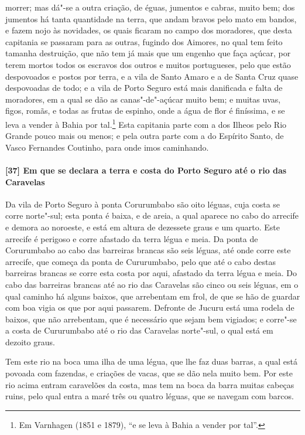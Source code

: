 morrer; mas dá"-se a outra criação, de éguas, jumentos e cabras, muito bem; dos jumentos há
tanta quantidade na terra, que andam bravos pelo mato em bandos, e fazem nojo às
novidades, os quais ficaram no campo dos moradores, que desta capitania se passaram para
as outras, fugindo dos Aimores, no qual tem feito tamanha destruição, que não tem já mais
que um engenho que faça açúcar, por terem mortos todos os escravos dos outros e muitos
portugueses, pelo que estão despovoados e postos por terra, e a vila de Santo Amaro e a de
Santa Cruz quase despovoadas de todo; e a vila de Porto Seguro está mais danificada e
falta de moradores, em a qual se dão as canas"-de"-açúcar muito bem; e muitas uvas, figos,
romãs, e todas as frutas de espinho, onde a água de flor é finíssima, e se leva a vender à
Bahia por tal.\footnote{ Em Varnhagen (1851 e 1879), ``e se leva à Bahia a vender por
tal''.} Esta capitania parte com a dos Ilheos pelo Rio Grande pouco mais ou menos; e pela
outra parte com a do Espírito Santo, de Vasco Fernandes Coutinho, para onde imos
caminhando.

\paragraph{[37] Em que se declara a terra e costa do Porto Seguro até o rio das Caravelas} \quad
Da vila de Porto Seguro à ponta Corurumbabo são oito léguas, cuja costa se corre
norte"-sul; esta ponta é baixa, e de areia, a qual aparece no cabo do arrecife e demora ao
noroeste, e está em altura de dezessete graus e um quarto. Este arrecife é perigoso e
corre afastado da terra légua e meia. Da ponta de Corurumbabo ao cabo das barreiras
brancas são seis léguas, até onde corre este arrecife, que começa da ponta de Cururumbabo,
pelo que até o cabo destas barreiras brancas se corre esta costa por aqui, afastado da
terra légua e meia. Do cabo das barreiras brancas até ao rio das Caravelas são cinco ou
seis léguas, em o qual caminho há alguns baixos, que arrebentam em frol, de que se hão de
guardar com boa vigia os que por aqui passarem. Defronte de Jucuru está uma rodela de
baixos, que não arrebentam, que é necessário que sejam bem vigiados; e corre"-se a costa de
Cururumbabo até o rio das Caravelas norte"-sul, o qual está em dezoito graus.

Tem este rio na boca uma ilha de uma légua, que lhe faz duas barras, a qual está povoada
com fazendas, e criações de vacas, que se dão nela muito bem. Por este rio acima entram
caravelões da costa, mas tem na boca da barra muitas cabeças ruins, pelo qual entra a maré
três ou quatro léguas, que se navegam com barcos.

